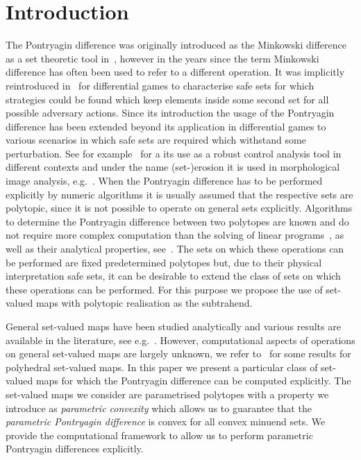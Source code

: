 \documentclass{elsarticle}
\theoremstyle{remark}
\theoremstyle{definition}
\begin{document}
\section{Introduction}
%
The Pontryagin difference was originally introduced as the Minkowski difference as a set theoretic tool in~\cite{Hadwiger:1950,Hadwiger:1957}, however in the years since the term Minkowski difference has often been used to refer to a different operation.
%
It was implicitly reintroduced in~\cite{Pontryagin:1966} for differential games to characterise safe sets for which strategies could be found which keep elements inside some second set for all possible adversary actions.
%
Since its introduction the usage of the Pontryagin difference has been extended beyond its application in differential games to various scenarios in which safe sets are required which withstand some perturbation.
%
See for example~\cite{blanchini:2007} for a its use as a robust control analysis tool in different contexts and under the name (set-)erosion it is used in morphological image analysis, e.g.~\cite{Haralick:1987}.
%
When the Pontryagin difference has to be performed explicitly by numeric algorithms it is usually assumed that the respective sets are polytopic, since it is not possible to operate on general sets explicitly.
%
Algorithms to determine the Pontryagin difference between two polytopes are known and do not require more complex computation than the solving of linear programs~\cite{Kolmanovsky:1998,Kerrigan:2003}, as well as their analytical properties, see~\cite{blanchini:2007,Haralick:1987,Kolmanovsky:1998}.
%
The sets on which these operations can be performed are fixed predetermined polytopes but, due to their physical interpretation safe sets, it can be desirable to extend the class of sets on which these operations can be performed.
%
For this purpose we propose the use of set-valued maps with polytopic realisation as the subtrahend.

General set-valued maps have been studied analytically and various results are available in the literature, see e.g.~\cite{Aubin:2009}.
%
However, computational aspects of operations on general set-valued maps are largely unknown, we refer to~\cite{Finzel:2000} for some results for polyhedral set-valued maps.
%
In this paper we present a particular class of set-valued maps for which the Pontryagin difference can be computed explicitly.
%
The set-valued maps we consider are parametrised polytopes with a property we introduce as \emph{parametric convexity} which allows us to guarantee that the \emph{parametric Pontryagin difference} is convex for all convex minuend sets.
%
We provide the computational framework to allow us to perform parametric Pontryagin differences explicitly.
\end{document}
